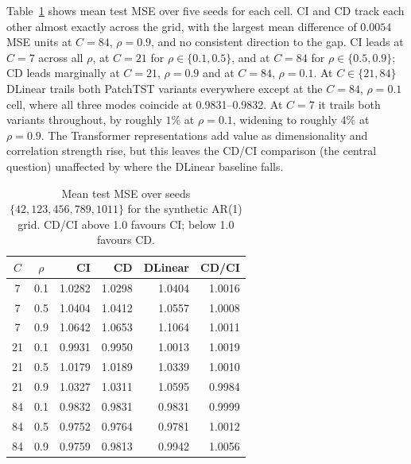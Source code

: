 \documentclass[10pt]{article} %
\begin{document}
    Table~\ref{tab:synthetic} shows mean test MSE over five seeds for each cell. CI and CD track each other almost exactly
    across the grid, with the largest mean difference of $0.0054$ MSE units at $C = 84$, $\rho = 0.9$, and no consistent
    direction to the gap. CI leads at $C = 7$ across all $\rho$, at $C = 21$ for $\rho \in \{0.1, 0.5\}$, and at $C = 84$
    for $\rho \in \{0.5, 0.9\}$; CD leads marginally at $C = 21$, $\rho = 0.9$ and at $C = 84$, $\rho = 0.1$. At
    $C \in \{21, 84\}$ DLinear trails both PatchTST variants everywhere except at the $C = 84$, $\rho = 0.1$ cell, where all
    three modes coincide at 0.9831--0.9832. At $C = 7$ it trails both variants throughout, by roughly $1\%$ at $\rho = 0.1$,
    widening to roughly $4\%$ at $\rho = 0.9$. The Transformer representations add value as dimensionality and correlation
    strength rise, but this leaves the CD/CI comparison (the central question) unaffected by where the DLinear baseline falls.

    \begin{table}[htbp]
        \centering
        \caption{Mean test MSE over seeds $\{42, 123, 456, 789, 1011\}$ for the synthetic AR(1) grid.
        CD/CI above 1.0 favours CI; below 1.0 favours CD.}
        \label{tab:synthetic}
        \begin{tabular}{ccrrrr}
            \toprule
            $C$ & $\rho$ & CI     & CD     & DLinear & CD/CI  \\
            \midrule
            7   & 0.1    & 1.0282 & 1.0298 & 1.0404  & 1.0016 \\
            7   & 0.5    & 1.0404 & 1.0412 & 1.0557  & 1.0008 \\
            7   & 0.9    & 1.0642 & 1.0653 & 1.1064  & 1.0011 \\
            \midrule
            21  & 0.1    & 0.9931 & 0.9950 & 1.0013  & 1.0019 \\
            21  & 0.5    & 1.0179 & 1.0189 & 1.0339  & 1.0010 \\
            21  & 0.9    & 1.0327 & 1.0311 & 1.0595  & 0.9984 \\
            \midrule
            84  & 0.1    & 0.9832 & 0.9831 & 0.9831  & 0.9999 \\
            84  & 0.5    & 0.9752 & 0.9764 & 0.9781  & 1.0012 \\
            84  & 0.9    & 0.9759 & 0.9813 & 0.9942  & 1.0056 \\
            \bottomrule
        \end{tabular}
    \end{table}
\end{document}
